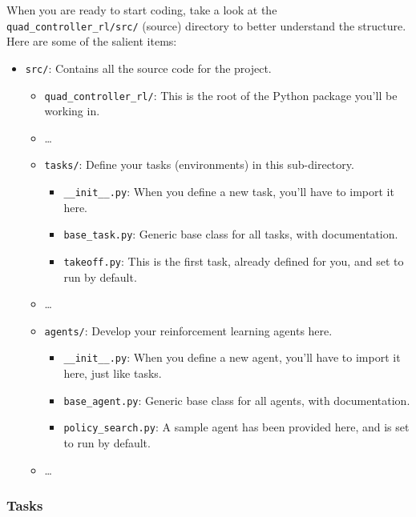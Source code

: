 \documentclass[11pt]{article}
\providecommand{\tightlist}{%
      \setlength{\itemsep}{0pt}\setlength{\parskip}{0pt}}
\begin{document}
When you are ready to start coding, take a look at the
\texttt{quad\_controller\_rl/src/} (source) directory to better
understand the structure. Here are some of the salient items:

\begin{itemize}
\tightlist
\item
  \texttt{src/}: Contains all the source code for the project.

  \begin{itemize}
  \tightlist
  \item
    \texttt{quad\_controller\_rl/}: This is the root of the Python
    package you'll be working in.
  \item
    \ldots{}
  \item
    \texttt{tasks/}: Define your tasks (environments) in this
    sub-directory.

    \begin{itemize}
    \tightlist
    \item
      \texttt{\_\_init\_\_.py}: When you define a new task, you'll have
      to import it here.
    \item
      \texttt{base\_task.py}: Generic base class for all tasks, with
      documentation.
    \item
      \texttt{takeoff.py}: This is the first task, already defined for
      you, and set to run by default.
    \end{itemize}
  \item
    \ldots{}
  \item
    \texttt{agents/}: Develop your reinforcement learning agents here.

    \begin{itemize}
    \tightlist
    \item
      \texttt{\_\_init\_\_.py}: When you define a new agent, you'll have
      to import it here, just like tasks.
    \item
      \texttt{base\_agent.py}: Generic base class for all agents, with
      documentation.
    \item
      \texttt{policy\_search.py}: A sample agent has been provided here,
      and is set to run by default.
    \end{itemize}
  \item
    \ldots{}
  \end{itemize}
\end{itemize}

\hypertarget{tasks}{%
\subsubsection{Tasks}\label{tasks}}
\end{document}
